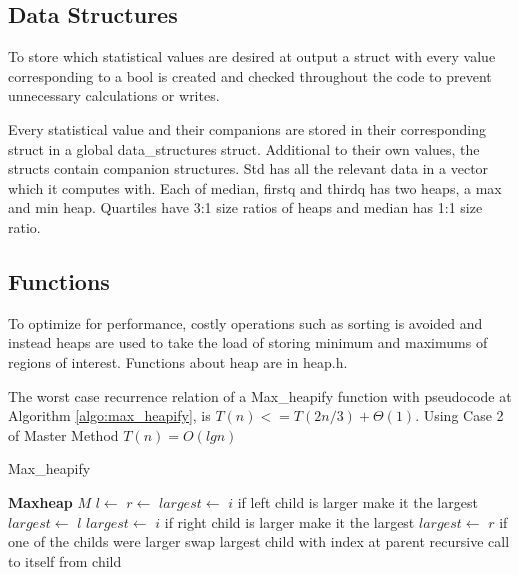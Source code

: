 \documentclass[a4paper, 12pt, titlepage]{article}
\begin{document}
\subsection{Data Structures}
To store which statistical values are desired at output a struct with every value corresponding to a bool is created and checked throughout the code to prevent unnecessary calculations or writes.
\par
Every statistical value and their companions are stored in their corresponding struct in a global data\_structures struct. Additional to their own values, the structs contain companion structures. Std has all the relevant data in a vector which it computes with. Each of median, firstq and thirdq has two heaps, a max and min heap. Quartiles have 3:1 size ratios of heaps and median has 1:1 size ratio. 
\subsection{Functions}
To optimize for performance, costly operations such as sorting is avoided and instead heaps are used to take the load of storing minimum and maximums of regions of interest. Functions about heap are in heap.h.
\par
The worst case recurrence relation of a Max\_heapify function with pseudocode at Algorithm \ref{algo:max_heapify}, is \( T(n) <= T(2n/3) + \Theta(1)\). Using Case 2 of Master Method \(T(n) = O(lg n)\)
\begin{algorithm}[]
	\caption{Max\_heapify}
	\label{algo:max_heapify}
	\begin{algorithmic}
	\State \textbf{Maxheap} $M$
        \State $l \gets$ 
        \State $r \gets$ 
        \State $largest \gets$ $i$
         \Comment if left child is larger make it the largest
		      \State  $ largest \gets$  $l$ 
        \Else
            \State  $ largest \gets$  $i$
        \EndIf
         \Comment if right child is larger make it the largest
            \State  $ largest \gets$  $r$ 
        \EndIf
         \Comment if one of the childs were larger
            \State {} \Comment swap largest child with index at parent
            \State {} \Comment recursive call to itself from child
	    \EndIf
	\EndFunction
	\end{algorithmic}
\end{algorithm}
\end{document}
